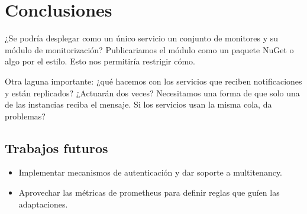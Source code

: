 \chapter{Conclusiones}
\label{chap:conclusiones}

¿Se podría desplegar como un único servicio un conjunto de monitores y su módulo de monitorización? Publicariamos el módulo como un paquete NuGet o algo por el estilo. Esto nos permitiría restrigir cómo.

Otra laguna importante: ¿qué hacemos con los servicios que reciben notificaciones y están replicados? ¿Actuarán dos veces? Necesitamos una forma de que solo una de las instancias reciba el mensaje. Si los servicios usan la misma cola, da problemas?

\section{Trabajos futuros}

\begin{itemize}
  \item Implementar mecanismos de autenticación y dar soporte a multitenancy.
  \item  Aprovechar las métricas de prometheus para definir reglas que guíen las adaptaciones.
\end{itemize}
